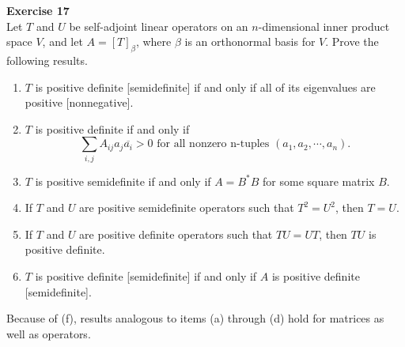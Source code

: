 \documentclass[12pt, a4paper]{article}
\theoremstyle{plain}
\newenvironment{exercise}[2][Exercise]
    { \begin{mdframed}[backgroundcolor=gray!20] \textbf{#1 #2} \\}
    {  \end{mdframed}}
\begin{document}
\begin{exercise}{17}
Let $T$ and $U$ be self-adjoint linear operators on an $n$-dimensional inner product space $V$, and let $A=[T]_\beta$, where $\beta$ is an orthonormal basis for $V$. Prove the following results.
\begin{enumerate}[label=(\alph*)]
\item $T$ is positive definite [semidefinite] if and only if all of its eigenvalues are positive [nonnegative].
\item $T$ is positive definite if and only if 
\[
\sum_{i,j}{A_{ij}a_j\overline{a_i}}>0 \text{ for all nonzero n-tuples }(a_1,a_2,\cdots,a_n).
\]
\item $T$ is positive semidefinite if and only if $A=B^*B$ for some square matrix $B$.
\item If $T$ and $U$ are positive semidefinite operators such that $T^2=U^2$, then $T=U$.
\item If $T$ and $U$ are positive definite operators such that $TU=UT$, then $TU$ is positive definite.
\item $T$ is positive definite [semidefinite] if and only if $A$ is positive definite [semidefinite].
\end{enumerate}
Because of (f), results analogous to items (a) through (d) hold for matrices as well as operators.
\end{exercise}
\end{document}
